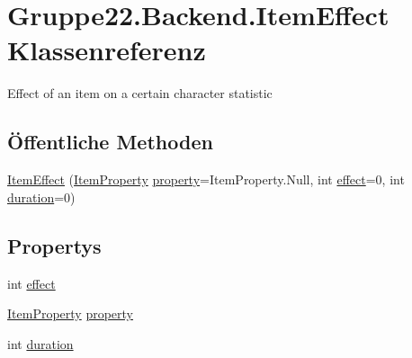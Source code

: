 \hypertarget{class_gruppe22_1_1_backend_1_1_item_effect}{\section{Gruppe22.\-Backend.\-Item\-Effect Klassenreferenz}
\label{class_gruppe22_1_1_backend_1_1_item_effect}
}


Effect of an item on a certain character statistic  


\subsection*{Öffentliche Methoden}
\begin{DoxyCompactItemize}
\item 
\hyperlink{class_gruppe22_1_1_backend_1_1_item_effect_a45389f27d8537fa7ff9adef341a53d16}{Item\-Effect} (\hyperlink{namespace_gruppe22_1_1_backend_a0bab4fb79b71059941f85a901606a7df}{Item\-Property} \hyperlink{class_gruppe22_1_1_backend_1_1_item_effect_ac58e4514f7c82e466da52ca6b03925cd}{property}=Item\-Property.\-Null, int \hyperlink{class_gruppe22_1_1_backend_1_1_item_effect_a9b6897a13e8e7b82698a90c4164d7ad4}{effect}=0, int \hyperlink{class_gruppe22_1_1_backend_1_1_item_effect_ae7de32850a9a94a778eae3155e39add0}{duration}=0)
\end{DoxyCompactItemize}
\subsection*{Propertys}
\begin{DoxyCompactItemize}
\item 
int \hyperlink{class_gruppe22_1_1_backend_1_1_item_effect_a9b6897a13e8e7b82698a90c4164d7ad4}{effect}
\item 
\hyperlink{namespace_gruppe22_1_1_backend_a0bab4fb79b71059941f85a901606a7df}{Item\-Property} \hyperlink{class_gruppe22_1_1_backend_1_1_item_effect_ac58e4514f7c82e466da52ca6b03925cd}{property}
\item 
int \hyperlink{class_gruppe22_1_1_backend_1_1_item_effect_ae7de32850a9a94a778eae3155e39add0}{duration}
\end{DoxyCompactItemize}


